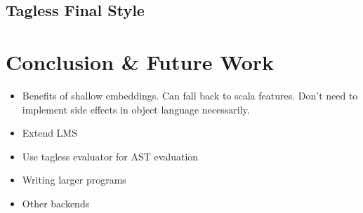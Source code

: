 \documentclass{article}
\begin{document}
\subsection{Tagless Final Style}\label{subsec:tagless}
\section{Conclusion \& Future Work}
\begin{itemize}
	\item Benefits of shallow embeddings. Can fall back to scala features. Don't need to implement side effects in object language necessarily.
	\item Extend LMS
	\item Use tagless evaluator for AST evaluation
	\item Writing larger programs
	\item Other backends
\end{itemize}



\end{document}
